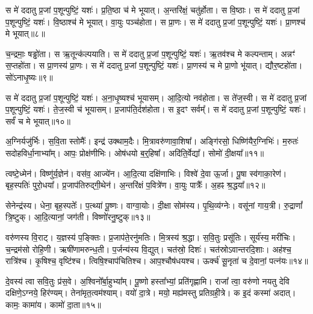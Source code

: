 स मे॑ ददातु प्र॒जां प॒शून्पुष्टिं॒ यशः॑। 
प्र॒ति॒ष्ठा च॑ मे भूयात्। 
अ॒न्तरि॑क्षं॒ चतु॑र्\mbox{}होता। 
स वि॒ष्ठाः। 
स मे॑ ददातु प्र॒जां प॒शून्पुष्टिं॒ यशः॑। 
वि॒ष्ठाश्च॑ मे भूयात्। 
वा॒युः पञ्च॑होता। 
स प्रा॒णः। 
स मे॑ ददातु प्र॒जां प॒शून्पुष्टिं॒ यशः॑। 
प्रा॒णश्च॑ मे भूयात्॥८॥\ip

च॒न्द्रमाः॒ षड्ढो॑ता। 
स ऋ॒तून्क॑ल्पयाति। 
स मे॑ ददातु प्र॒जां प॒शून्पुष्टिं॒ यशः॑। 
ऋ॒तव॑श्च मे कल्पन्ताम्। 
अन्नꣳ॑ स॒प्तहो॑ता। 
स प्रा॒णस्य॑ प्रा॒णः। 
स मे॑ ददातु प्र॒जां प॒शून्पुष्टिं॒ यशः॑। 
प्रा॒णस्य॑ च मे प्रा॒णो भू॑यात्। 
द्यौर॒ष्टहो॑ता। 
सो॑ऽनाधृ॒ष्यः॥९॥\ip

स मे॑ ददातु प्र॒जां प॒शून्पुष्टिं॒ यशः॑। 
अ॒ना॒धृ॒ष्यश्च॑ भूयासम्। 
आ॒दि॒त्यो नव॑होता। 
स ते॑ज॒स्वी। 
स मे॑ ददातु प्र॒जां प॒शून्पुष्टिं॒ यशः॑। 
ते॒ज॒स्वी च॑ भूयासम्। 
प्र॒जाप॑ति॒र्दश॑होता। 
स इ॒दꣳ सर्वम्᳚। 
स मे॑ ददातु प्र॒जां प॒शून्पुष्टिं॒ यशः॑। 
सर्वं॑ च मे भूयात्॥१०॥\ip
\anuvakamend[प्र॒ति॒ष्ठा प्रा॒णश्च॑ मे भूयादनाधृ॒ष्यः सर्वं॑ च मे भूयात्]

अ॒ग्निर्यजु॑र्भिः। 
स॒वि॒ता स्तोमैः᳚। 
इन्द्र॑ उक्थाम॒दैः। 
मि॒त्रावरु॑णा\-वा॒शिषा᳚। 
अङ्गि॑रसो॒ धिष्णि॑यैर॒ग्निभिः॑। 
म॒रुतः॑ सदोहविर्धा॒नाभ्या᳚म्। 
आपः॒ प्रोक्ष॑णीभिः। 
ओष॑धयो ब॒र्॒‌हिषा᳚। 
अदि॑ति॒र्वेद्या᳚। 
सोमो॑ दी॒क्षया᳚॥११॥\ip

त्वष्टे॒ध्मेन॑। 
विष्णु॑र्\mbox{}य॒ज्ञेन॑। 
वस॑व॒ आज्ये॑न। 
आ॒दि॒त्या दक्षि॑णाभिः। 
विश्वे॑ दे॒वा ऊ॒र्जा। 
पू॒षा स्व॑गाका॒रेण॑। 
बृह॒स्पतिः॑ पुरो॒धया᳚। 
प्र॒जाप॑तिरुद्गी॒थेन॑। 
अ॒न्तरि॑क्षं प॒वित्रे॑ण। 
वा॒युः पात्रैः᳚। 
अ॒हꣴ श्र॒द्धया᳚॥१२॥\ip
\anuvakamend[दी॒क्षया॒ पात्रै॒रेकं॑ च]

सेनेन्द्र॑स्य। 
धेना॒ बृह॒स्पतेः᳚। 
प॒त्थ्या॑ पू॒ष्णः। 
वाग्वा॒योः। 
दी॒क्षा सोम॑स्य। 
पृ॒थि॒व्य॑ग्नेः। 
वसू॑नां  गाय॒त्री। 
रु॒द्राणां᳚ त्रि॒ष्टुक्। 
आ॒दि॒त्यानां॒ जग॑ती। 
विष्णो॑रनु॒ष्टुक्॥१३॥\ip%

वरु॑णस्य वि॒राट्। 
य॒ज्ञस्य॑ प॒ङ्क्तिः। 
प्र॒जाप॑ते॒रनु॑मतिः। 
मि॒त्रस्य॑ श्र॒द्धा। 
स॒वि॒तुः प्रसू॑तिः। 
सूर्य॑स्य॒ मरी॑चिः। 
च॒न्द्रम॑सो रोहि॒णी। 
ऋषी॑णामरुन्ध॒ती। 
प॒र्जन्य॑स्य वि॒द्युत्। 
चत॑स्रो॒ दिशः॑। 
चत॑स्रोऽवान्तरदि॒शाः। 
अह॑श्च॒ रात्रि॑श्च। 
कृ॒षिश्च॒ वृष्टि॑श्च। 
त्विषि॒श्चा\-प॑\-चितिश्च। 
आप॒श्चौष॑धयश्च। 
ऊर्क्च॑ सू॒नृता॑ च दे॒वानां॒ पत्न॑यः॥१४॥\ip%
\anuvakamend[अ॒नु॒ष्टुग्दिशः॒ षट्च॑]

दे॒वस्य॑ त्वा सवि॒तुः प्र॑स॒वे। 
अ॒श्विनो᳚र्बा॒हुभ्या᳚म्। 
पू॒ष्णो हस्ता᳚भ्यां॒ प्रति॑गृह्णामि। 
राजा᳚ त्वा॒ वरु॑णो नयतु देवि दक्षिणे॒ऽग्नये॒ हिर॑ण्यम्। 
तेना॑मृत॒त्वम॑श्याम्। 
वयो॑ दा॒त्रे। 
मयो॒ मह्य॑मस्तु प्रतिग्रही॒त्रे। 
क इ॒दं कस्मा॑ अदात्। 
कामः॒ कामा॑य। 
कामो॑ दा॒ता॥१५॥\ip


